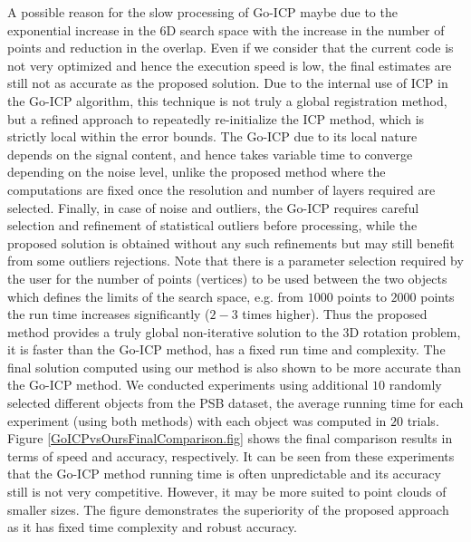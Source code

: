 \documentclass{UCF_ETD}
\begin{document}
A possible reason for the slow processing of Go-ICP maybe due to the exponential increase in the $6$D search space with the increase in the number of points and reduction in the overlap. Even if we consider that the current code is not very optimized and hence the execution speed is low, the final estimates are still not as accurate as the proposed solution. Due to the internal use of ICP in the Go-ICP algorithm, this technique is not truly a global registration method, but a refined approach to repeatedly re-initialize the ICP method, which is strictly local within the error bounds. The Go-ICP due to its local nature depends on the signal content, and hence takes variable time to converge depending on the noise level, unlike the proposed method where the computations are fixed once the resolution and number of layers required are selected. 
Finally, in case of noise and outliers, the Go-ICP requires careful selection and refinement of statistical outliers before processing, while the proposed solution is obtained without any such refinements but may still benefit from some outliers rejections. Note that there is a parameter selection required by the user for the number of points (vertices) to be used between the two objects which defines the limits of the search space, e.g. from $1000$ points to $2000$ points the run time increases significantly ($2-3$ times higher).
Thus the proposed method provides a truly global non-iterative solution to the $3$D rotation problem, it is faster than the Go-ICP method, has a fixed run time and complexity. The final solution computed using our method is also shown to be more accurate than the Go-ICP method. We conducted experiments using additional $10$ randomly selected different objects from the PSB dataset, the average running time for each experiment (using both methods) with each object was computed in $20$ trials. Figure \ref{GoICPvsOursFinalComparison.fig} shows the final comparison results in terms of speed and accuracy, respectively. It can be seen from these experiments that the Go-ICP method running time is often unpredictable and its accuracy still is not very competitive. However, it may be more suited to   point clouds of smaller sizes. The figure demonstrates the superiority of the proposed approach as it has fixed time complexity and robust accuracy. 
\end{document}
